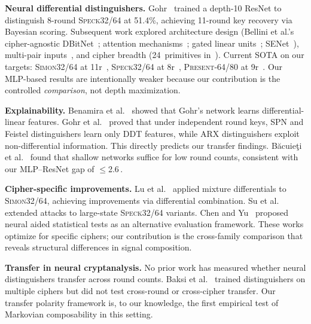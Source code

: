 \documentclass[runningheads]{llncs}
\newcommand{\speck}{\textsc{Speck32/64}\xspace}
\newcommand{\simon}{\textsc{Simon32/64}\xspace}
\newcommand{\present}{\textsc{Present-64/80}\xspace}
\newcommand{\pp}{\,\text{pp}}  %
\begin{document}
\textbf{Neural differential distinguishers.}
Gohr~\cite{gohr2019} trained a depth-10 ResNet to distinguish 8-round \speck at 51.4\%, achieving 11-round key recovery via Bayesian scoring.
Subsequent work explored architecture design (Bellini et al.'s cipher-agnostic DBitNet~\cite{bellini2023dbitnet}; attention mechanisms~\cite{lee2024attention}; gated linear units~\cite{jang2023glu}; SENet~\cite{bao2022enhancing}), multi-pair inputs~\cite{zhang2025multipair}, and cipher breadth (24~primitives in~\cite{gerault2024sok}).
Current SOTA on our targets: \simon at 11r~\cite{bellini2023dbitnet,tian2022simon}, \speck at 8r~\cite{gohr2019}, \present at 9r~\cite{bellini2023dbitnet}.
Our MLP-based results are intentionally weaker because our contribution is the controlled \emph{comparison}, not depth maximization.

\begin{sloppypar}
\textbf{Explainability.}
Benamira et al.~\cite{benamira2021deeper} showed that Gohr's network learns differential-linear features.
Gohr et al.~\cite{gohr2022assessment} proved that under independent round keys, SPN and Feistel distinguishers learn only DDT features, while ARX distinguishers exploit non-differential information.
This directly predicts our transfer findings.
B\u{a}cuie\c{t}i et al.~\cite{bacuieti2022depth} found that shallow networks suffice for low round counts, consistent with our MLP--ResNet gap of $\leq$2.6\pp.
\end{sloppypar}

\textbf{Cipher-specific improvements.}
Lu et al.~\cite{lu2024mixture} applied mixture differentials to \simon, achieving improvements via differential combination.
Su et al.~\cite{su2024partial} extended attacks to large-state \speck variants.
Chen and Yu~\cite{chen2021neuralcrypt} proposed neural aided statistical tests as an alternative evaluation framework.
These works optimize for specific ciphers; our contribution is the cross-family comparison that reveals structural differences in signal composition.

\textbf{Transfer in neural cryptanalysis.}
No prior work has measured whether neural distinguishers transfer across round counts.
Baksi et al.~\cite{baksi2022neural} trained distinguishers on multiple ciphers but did not test cross-round or cross-cipher transfer.
Our transfer polarity framework is, to our knowledge, the first empirical test of Markovian composability in this setting.

\end{document}
